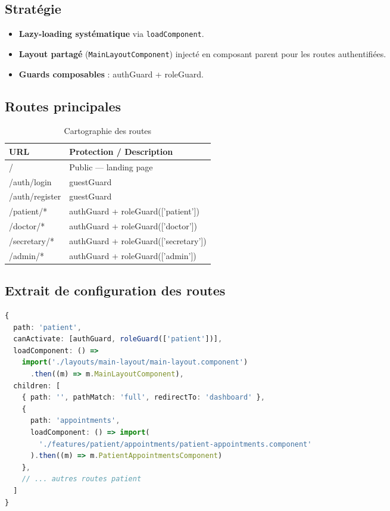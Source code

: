 \documentclass[11pt,a4paper]{article}
\begin{document}
\subsection{Stratégie}

\begin{itemize}
  \item \textbf{Lazy-loading systématique} via \texttt{loadComponent}.
  \item \textbf{Layout partagé} (\texttt{MainLayoutComponent}) injecté en
        composant parent pour les routes authentifiées.
  \item \textbf{Guards composables} : authGuard + roleGuard.
\end{itemize}

\subsection{Routes principales}

\begin{table}[H]
\centering
\renewcommand{\arraystretch}{1.4}
\begin{tabularx}{\textwidth}{>{\ttfamily}lX}
\toprule
\rowcolor{primary!10}
\textbf{URL} & \textbf{Protection / Description} \\
\midrule
/ & Public — landing page \\
/auth/login & guestGuard \\
/auth/register & guestGuard \\
/patient/* & authGuard + roleGuard(['patient']) \\
/doctor/* & authGuard + roleGuard(['doctor']) \\
/secretary/* & authGuard + roleGuard(['secretary']) \\
/admin/* & authGuard + roleGuard(['admin']) \\
\bottomrule
\end{tabularx}
\caption{Cartographie des routes}
\end{table}

\subsection{Extrait de configuration des routes}

\begin{lstlisting}[language=TypeScript]
{
  path: 'patient',
  canActivate: [authGuard, roleGuard(['patient'])],
  loadComponent: () =>
    import('./layouts/main-layout/main-layout.component')
      .then((m) => m.MainLayoutComponent),
  children: [
    { path: '', pathMatch: 'full', redirectTo: 'dashboard' },
    {
      path: 'appointments',
      loadComponent: () => import(
        './features/patient/appointments/patient-appointments.component'
      ).then((m) => m.PatientAppointmentsComponent)
    },
    // ... autres routes patient
  ]
}
\end{lstlisting}
\end{document}
